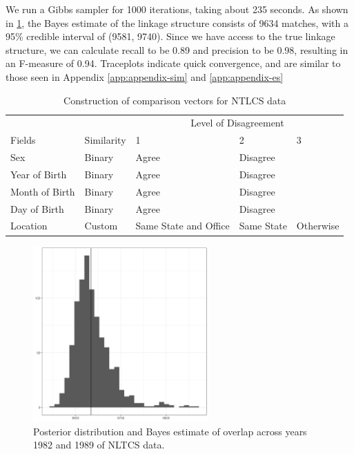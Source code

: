 \documentclass[ba]{imsart}
\begin{document}
	We run a Gibbs sampler for 1000 iterations, taking about 235 seconds. As shown in  \ref{fig:nltcs-overlap-plot}, the Bayes estimate of the linkage structure consists of 9634 matches, with a 95\% credible interval of (9581, 9740). Since we have access to the true linkage structure, we can calculate recall to be 0.89 and precision to be 0.98, resulting in an F-measure of 0.94. Traceplots indicate quick convergence, and are similar to those seen in Appendix \ref{app:appendix-sim} and \ref{app:appendix-es}
	
	\begin{table}
		\centering
		\begin{tabular}[t]{lllll}
			\hline
			\multicolumn{2}{c}{ } & \multicolumn{3}{c}{Level of Disagreement} \\
			\cline{3-5}
			Fields & Similarity & 1 & 2 & 3\\
			\hline
			Sex & Binary & Agree & Disagree & \\
			Year of Birth & Binary & Agree & Disagree & \\
			Month of Birth & Binary & Agree & Disagree & \\
			Day of Birth & Binary & Agree & Disagree & \\
			Location & Custom & Same State and Office & Same State & Otherwise \\
			\hline
		\end{tabular}
		\caption{Construction of comparison vectors for NTLCS data}\label{Tab:nltcs-comparisons}
	\end{table}
	
	\begin{figure}[h]
		\begin{center}
			\includegraphics[width=0.6\textwidth]{../notes/figures/nltcs/overlap_posterior4}
			\caption{Posterior distribution and Bayes estimate of overlap across years 1982 and 1989 of NLTCS data.}
			\label{fig:nltcs-overlap-plot}
		\end{center}
	\end{figure}
	
\end{document}
